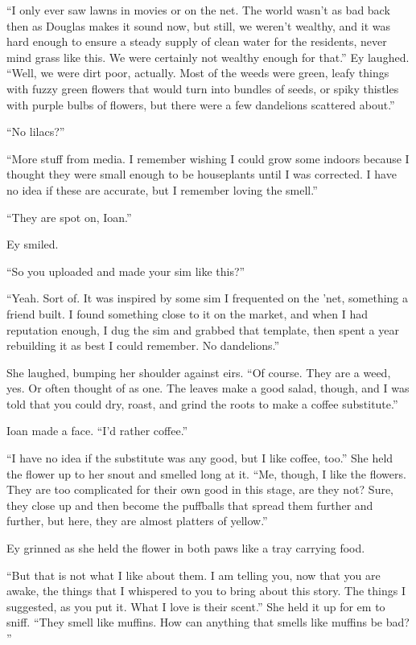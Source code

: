 ``I only ever saw lawns in movies or on the net. The world wasn't as bad back then as Douglas makes it sound now, but still, we weren't wealthy, and it was hard enough to ensure a steady supply of clean water for the residents, never mind grass like this. We were certainly not wealthy enough for that.'' Ey laughed. ``Well, we were dirt poor, actually. Most of the weeds were green, leafy things with fuzzy green flowers that would turn into bundles of seeds, or spiky thistles with purple bulbs of flowers, but there were a few dandelions scattered about.''

``No lilacs?''

``More stuff from media. I remember wishing I could grow some indoors because I thought they were small enough to be houseplants until I was corrected. I have no idea if these are accurate, but I remember loving the smell.''

``They are spot on, Ioan.''

Ey smiled.

``So you uploaded and made your sim like this?''

``Yeah. Sort of. It was inspired by some sim I frequented on the 'net, something a friend built. I found something close to it on the market, and when I had reputation enough, I dug the sim and grabbed that template, then spent a year rebuilding it as best I could remember. No dandelions.''

She laughed, bumping her shoulder against eirs. ``Of course. They are a weed, yes. Or often thought of as one. The leaves make a good salad, though, and I was told that you could dry, roast, and grind the roots to make a coffee substitute.''

Ioan made a face. ``I'd rather coffee.''

``I have no idea if the substitute was any good, but I like coffee, too.'' She held the flower up to her snout and smelled long at it. ``Me, though, I like the flowers. They are too complicated for their own good in this stage, are they not? Sure, they close up and then become the puffballs that spread them further and further, but here, they are almost platters of yellow.''

Ey grinned as she held the flower in both paws like a tray carrying food.

``But that is not what I like about them. I am telling you, now that you are awake, the things that I whispered to you to bring about this story. The things I suggested, as you put it. What I love is their scent.'' She held it up for em to sniff. ``They smell like muffins. How can anything that smells like muffins be bad? ''

